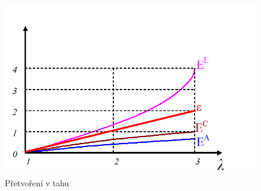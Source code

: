 \begin{figure}[H]
	\centering
	\includegraphics{Obrazky/tenzory-pretvoreni}
	\caption{Přetvoření v tahu}
	\label{fig:tenzory-pretvoreni}
\end{figure}
